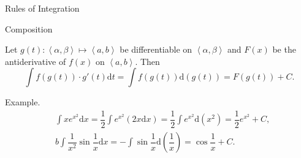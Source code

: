 \documentclass[aspectratio=169, UTF8]{ctexbeamer}
\begin{document}
    \begin{frame}[t]{Rules of Integration}
        \begin{block}{Composition}
            \par Let $g(t): \left\langle\alpha,\beta\right\rangle \mapsto \left\langle a, b\right\rangle$ be differentiable on $\left\langle\alpha,\beta\right\rangle$ and $F(x)$ be the antiderivative of $f(x)$ on $\left\langle a, b\right\rangle$. Then $$\int f(g(t))\cdot g'(t)\mathrm{d}t = \int f(g(t))\mathrm{d}(g(t)) = F(g(t)) + C.$$
        \end{block}
        \par \textcolor{yy}{Example.}
        \begin{equation*}
            \begin{aligned}
                & \int x e^{x^2} \mathrm{d}x = \dfrac{1}{2}\int e^{x^2} (2x\mathrm{d}x) = \dfrac{1}{2}\int e^{x^2}\mathrm{d}(x^2) = \dfrac{1}{2}e^{x^2} + C, \\
                & b\int\dfrac{1}{x^2}\sin\dfrac{1}{x}\mathrm{d}x = -\int \sin \dfrac{1}{x}\mathrm{d}\left(\dfrac{1}{x}\right) = \cos \dfrac{1}{x} + C.
            \end{aligned}
        \end{equation*}
    \end{frame}
\end{document}
